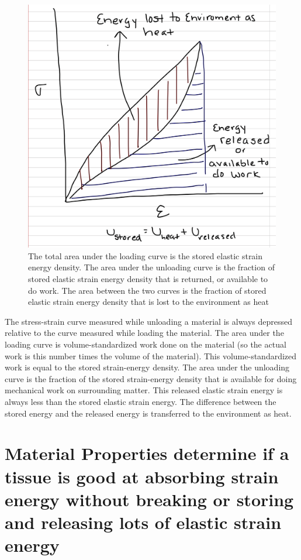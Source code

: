 \documentclass[]{book}
\begin{document}
\begin{figure}
\centering
\includegraphics{images/materials_chapter/elastic_energy_storage_2.png}
\caption{\label{fig:unnamed-chunk-12}The total area under the loading curve
is the stored elastic strain energy density. The area under the
unloading curve is the fraction of stored elastic strain energy density
that is returned, or available to do work. The area between the two
curves is the fraction of stored elastic strain energy density that is
lost to the environment as heat}
\end{figure}

The stress-strain curve measured while unloading a material is always
depressed relative to the curve measured while loading the material. The
area under the loading curve is volume-standardized work done on the
material (so the actual work is this number times the volume of the
material). This volume-standardized work is equal to the stored
strain-energy density. The area under the unloading curve is the
fraction of the stored strain-energy density that is available for doing
mechanical work on surrounding matter. This released elastic strain
energy is always less than the stored elastic strain energy. The
difference between the stored energy and the released energy is
transferred to the environment as heat.

\section{Material Properties determine if a tissue is good at absorbing
strain energy without breaking or storing and releasing lots of elastic
strain
energy}\label{material-properties-determine-if-a-tissue-is-good-at-absorbing-strain-energy-without-breaking-or-storing-and-releasing-lots-of-elastic-strain-energy}
\end{document}
